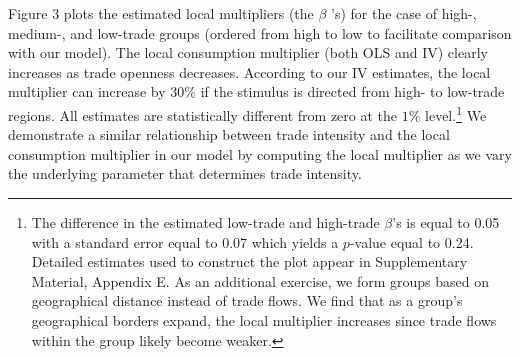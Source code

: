 \documentclass[\latexroot/\projectname]{subfiles}
\begin{document}
Figure 3 plots the estimated local multipliers (the $\beta$ 's) for the case of high-, medium-, and low-trade groups (ordered from high to low to facilitate comparison with our model). The local consumption multiplier (both OLS and IV) clearly increases as trade openness decreases. According to our IV estimates, the local multiplier can increase by $30 \%$ if the stimulus is directed from high- to low-trade regions. All estimates are statistically different from zero at the $1 \%$ level.\footnote{The difference in the estimated low-trade and high-trade $\beta$'s is equal to 0.05 with a standard error equal to 0.07 which yields a $p$-value equal to 0.24. Detailed estimates used to construct the plot appear in Supplementary Material, Appendix E. As an additional exercise, we form groups based on geographical distance instead of trade flows. We find that as a group's geographical borders expand, the local multiplier increases since trade flows within the group likely become weaker.} We demonstrate a similar relationship between trade intensity and the local consumption multiplier in our model by computing the local multiplier as we vary the underlying parameter that determines trade intensity.

\smartbib

\pdfonly{
  \captionsetup[figure]{list=no}
  \captionsetup[table]{list=no}
}
\end{document}
